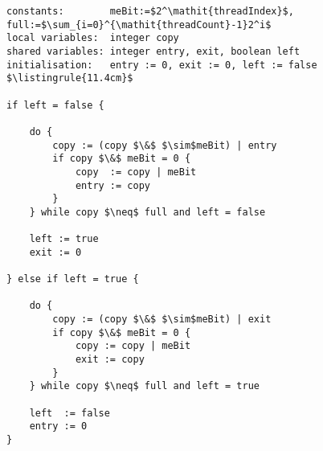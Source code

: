 \begin{center}
\begin{minipage}{\textwidth}
\begin{lstlisting}[mathescape, linewidth=11.4cm]
constants:        meBit:=$2^\mathit{threadIndex}$, full:=$\sum_{i=0}^{\mathit{threadCount}-1}2^i$
local variables:  integer copy
shared variables: integer entry, exit, boolean left
initialisation:   entry := 0, exit := 0, left := false
$\listingrule{11.4cm}$

if left = false {

	do {
		copy := (copy $\&$ $\sim$meBit) | entry
		if copy $\&$ meBit = 0 {
			copy  := copy | meBit
			entry := copy
		}
	} while copy $\neq$ full and left = false

	left := true
	exit := 0

} else if left = true {

	do {
		copy := (copy $\&$ $\sim$meBit) | exit
		if copy $\&$ meBit = 0 {
			copy := copy | meBit
			exit := copy
		}
	} while copy $\neq$ full and left = true

	left  := false
	entry := 0
}
\end{lstlisting}
\end{minipage}
\end{center}

